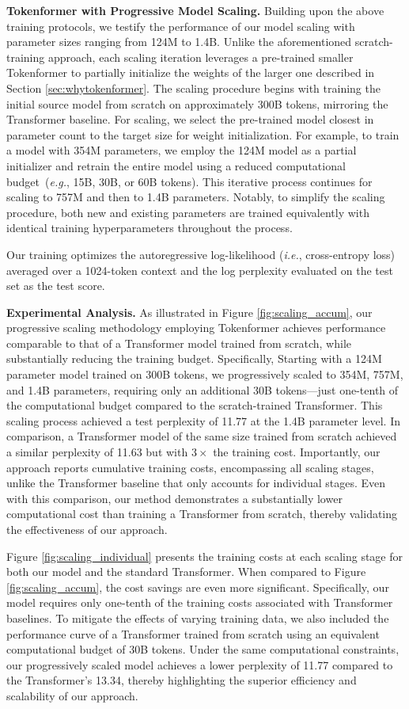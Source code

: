 \documentclass{article} %
\newcommand{\ourmethod}{Tokenformer\xspace}
\begin{document}
\textbf{\ourmethod with Progressive Model Scaling.} Building upon the above training protocols, we testify the performance of our model scaling with parameter sizes ranging from 124M to 1.4B. Unlike the aforementioned scratch-training approach, each scaling iteration leverages a pre-trained smaller \ourmethod to partially initialize the weights of the larger one described in Section \ref{sec:whytokenformer}. The scaling procedure begins with training the initial source model from scratch on approximately 300B tokens, mirroring the Transformer baseline. For scaling, we select the pre-trained model closest in parameter count to the target size for weight initialization. For example, to train a model with 354M parameters, we employ the 124M model as a partial initializer and retrain the entire model using a reduced computational budget~(\textit{e.g.}, 15B, 30B, or 60B tokens). This iterative process continues for scaling to 757M and then to 1.4B parameters. Notably, to simplify the scaling procedure, both new and existing parameters are trained equivalently with identical training hyperparameters throughout the process.

Our training optimizes the autoregressive log-likelihood (\textit{i.e.}, cross-entropy loss) averaged over a 1024-token context and the log perplexity evaluated on the test set as the test score.

\textbf{Experimental Analysis.} As illustrated in Figure \ref{fig:scaling_accum}, our progressive scaling methodology employing \ourmethod achieves performance comparable to that of a Transformer model trained from scratch, while substantially reducing the training budget. Specifically, Starting with a 124M parameter model trained on 300B tokens, we progressively scaled to 354M, 757M, and 1.4B parameters, requiring only an additional 30B tokens—just one-tenth of the computational budget compared to the scratch-trained Transformer. This scaling process achieved a test perplexity of 11.77 at the 1.4B parameter level. In comparison, a Transformer model of the same size trained from scratch achieved a similar perplexity of 11.63 but with $3\times$ the training cost. Importantly, our approach reports cumulative training costs, encompassing all scaling stages, unlike the Transformer baseline that only accounts for individual stages. Even with this comparison, our method demonstrates a substantially lower computational cost than training a Transformer from scratch, thereby validating the effectiveness of our approach.

Figure \ref{fig:scaling_individual} presents the training costs at each scaling stage for both our model and the standard Transformer. When compared to Figure \ref{fig:scaling_accum}, the cost savings are even more significant. Specifically, our model requires only one-tenth of the training costs associated with Transformer baselines. To mitigate the effects of varying training data, we also included the performance curve of a Transformer trained from scratch using an equivalent computational budget of 30B tokens. Under the same computational constraints, our progressively scaled model achieves a lower perplexity of 11.77 compared to the Transformer's 13.34, thereby highlighting the superior efficiency and scalability of our approach.
\end{document}
